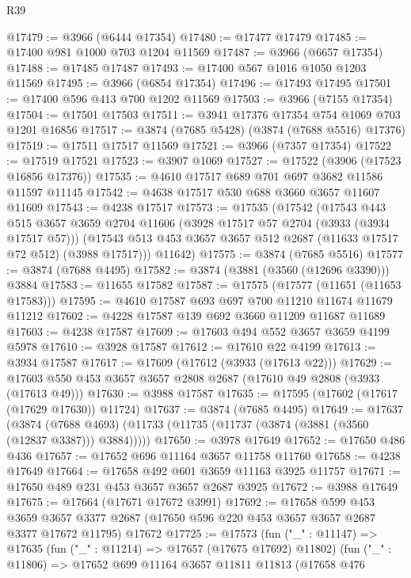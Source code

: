 \begin{lexlean}{R39}
\begin{coremodule}
@17479 := @3966 (@6444 @17354)
@17480 := @17477 @17479
@17485 := @17400 @981 @1000 @703 @1204 @11569
@17487 := @3966 (@6657 @17354)
@17488 := @17485 @17487
@17493 := @17400 @567 @1016 @1050 @1203 @11569
@17495 := @3966 (@6854 @17354)
@17496 := @17493 @17495
@17501 := @17400 @596 @413 @700 @1202 @11569
@17503 := @3966 (@7155 @17354)
@17504 := @17501 @17503
@17511 := @3941 @17376 @17354 @754 @1069 @703 @1201 @16856
@17517 := @3874 (@7685 @5428) (@3874 (@7688 @5516) @17376)
@17519 := @17511 @17517 @11569
@17521 := @3966 (@7357 @17354)
@17522 := @17519 @17521
@17523 := @3907 @1069
@17527 := @17522 (@3906 (@17523 @16856 @17376))
@17535 := @4610 @17517 @689 @701 @697 @3682 @11586 @11597 @11145
@17542 := @4638 @17517 @530 @688 @3660 @3657 @11607 @11609
@17543 := @4238 @17517
@17573 := @17535
    (@17542
      (@17543
        @443
        @515
        @3657
        @3659
        @2704
        @11606
        (@3928 @17517 @57 @2704 (@3933 (@3934 @17517 @57)))
        (@17543 @513 @453 @3657 @3657 @512 @2687 (@11633 @17517 @72 @512) (@3988 @17517)))
      @11642)
@17575 := @3874 (@7685 @5516)
@17577 := @3874 (@7688 @4495)
@17582 := @3874 (@3881 (@3560 (@12696 @3390))) @3884
@17583 := @11655 @17582
@17587 := @17575 (@17577 (@11651 (@11653 @17583)))
@17595 := @4610 @17587 @693 @697 @700 @11210 @11674 @11679 @11212
@17602 := @4228 @17587 @139 @692 @3660 @11209 @11687 @11689
@17603 := @4238 @17587
@17609 := @17603 @494 @552 @3657 @3659 @4199 @5978
@17610 := @3928 @17587
@17612 := @17610 @22 @4199
@17613 := @3934 @17587
@17617 := @17609 (@17612 (@3933 (@17613 @22)))
@17629 := @17603 @550 @453 @3657 @3657 @2808 @2687 (@17610 @49 @2808 (@3933 (@17613 @49)))
@17630 := @3988 @17587
@17635 := @17595 (@17602 (@17617 (@17629 @17630)) @11724)
@17637 := @3874 (@7685 @4495)
@17649 := @17637
    (@3874 (@7688 @4693) (@11733 (@11735 (@11737 (@3874 (@3881 (@3560 (@12837 @3387))) @3884)))))
@17650 := @3978 @17649
@17652 := @17650 @486 @436
@17657 := @17652 @696 @11164 @3657 @11758 @11760
@17658 := @4238 @17649
@17664 := @17658 @492 @601 @3659 @11163 @3925 @11757
@17671 := @17650 @489 @231 @453 @3657 @3657 @2687 @3925
@17672 := @3988 @17649
@17675 := @17664 (@17671 @17672 @3991)
@17692 := @17658
    @599
    @453
    @3659
    @3657
    @3377
    @2687
    (@17650 @596 @220 @453 @3657 @3657 @2687 @3377 @17672 @11795)
    @17672
@17725 := @17573
    (fun ("_" : @11147) =>
    @17635
      (fun ("_" : @11214) => @17657 (@17675 @17692) @11802)
      (fun ("_" : @11806) =>
      @17652
        @699
        @11164
        @3657
        @11811
        @11813
        (@17658
          @476

\end{coremodule}
\end{lexlean}
